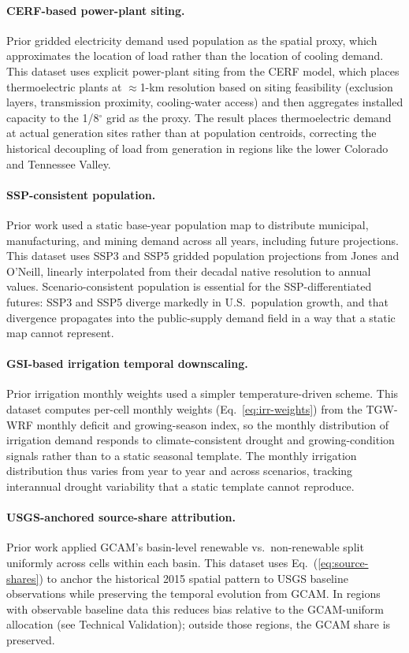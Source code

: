 \documentclass[fleqn,10pt]{wlscirep}
\begin{document}
\paragraph{CERF-based power-plant siting.} Prior gridded electricity demand used population as the spatial proxy, which approximates the location of load rather than the location of cooling demand. This dataset uses explicit power-plant siting from the CERF model\cite{Vernon2021}, which places thermoelectric plants at $\approx$1-km resolution based on siting feasibility (exclusion layers, transmission proximity, cooling-water access) and then aggregates installed capacity to the 1/8$^{\circ}$ grid as the proxy. The result places thermoelectric demand at actual generation sites rather than at population centroids, correcting the historical decoupling of load from generation in regions like the lower Colorado and Tennessee Valley.

\paragraph{SSP-consistent population.} Prior work used a static base-year population map to distribute municipal, manufacturing, and mining demand across all years, including future projections. This dataset uses SSP3 and SSP5 gridded population projections from Jones and O'Neill\cite{Jones_2016}, linearly interpolated from their decadal native resolution to annual values. Scenario-consistent population is essential for the SSP-differentiated futures: SSP3 and SSP5 diverge markedly in U.S.~population growth, and that divergence propagates into the public-supply demand field in a way that a static map cannot represent.

\paragraph{GSI-based irrigation temporal downscaling.} Prior irrigation monthly weights used a simpler temperature-driven scheme. This dataset computes per-cell monthly weights (Eq.~\ref{eq:irr-weights}) from the TGW-WRF monthly deficit and growing-season index, so the monthly distribution of irrigation demand responds to climate-consistent drought and growing-condition signals rather than to a static seasonal template. The monthly irrigation distribution thus varies from year to year and across scenarios, tracking interannual drought variability that a static template cannot reproduce.

\paragraph{USGS-anchored source-share attribution.} Prior work applied GCAM's basin-level renewable vs.\ non-renewable split uniformly across cells within each basin. This dataset uses Eq.~(\ref{eq:source-shares}) to anchor the historical 2015 spatial pattern to USGS baseline observations while preserving the temporal evolution from GCAM. In regions with observable baseline data this reduces bias relative to the GCAM-uniform allocation (see Technical Validation); outside those regions, the GCAM share is preserved.
\end{document}
